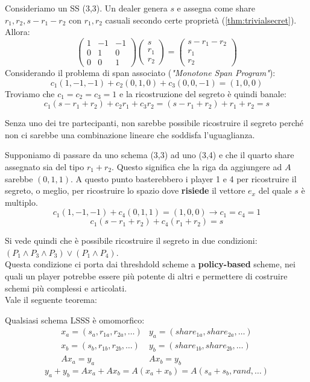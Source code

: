 \begin{example}
Consideriamo un SS (3,3). Un dealer genera $s$ e assegna come share $r_1,r_2,s-r_1-r_2$ con $r_1,r_2$ casuali secondo certe proprietà (\cref{thm:trivialsecret}). Allora:
\[
\left(\begin{array}{ccc}
  1 & - 1 & - 1\\
  0 & 1 & 0\\
  0 & 0 & 1
\end{array}\right)\left(\begin{array}{c}
  s\\
  r_1\\
  r_2
\end{array}\right)=\left(\begin{array}{c}
  s - r_1 - r_2\\
  r_1\\
  r_2
\end{array}\right)
\]
Considerando il problema di span associato (\textit{"Monotone Span Program"}): 
\[c_1(1,-1,-1)+c_2(0,1,0)+c_3(0,0,-1)=(1,0,0)\]
Troviamo che $c_1=c_2=c_3=1$ e la ricostruzione del segreto è quindi banale:
\[c_1(s-r_1+r_2)+c_2r_1+c_3r_2=(s-r_1+r_2)+r_1+r_2=s\]
\begin{note}
Senza uno dei tre partecipanti, non sarebbe possibile ricostruire il segreto perché non ci sarebbe una combinazione lineare che soddisfa l'uguaglianza.
\end{note}
\end{example}
\begin{note}
Supponiamo di passare da uno schema (3,3) ad uno (3,4) e che il quarto share assegnato sia del tipo $r_1+r_2$. Questo significa che la riga da aggiungere ad $A$ sarebbe $(0,1,1)$. A questo punto basterebbero i player 1 e 4 per ricostruire il segreto, o meglio, per ricostruire lo spazio dove \textbf{risiede} il vettore $e_x$ del quale $s$ è multiplo.
\[c_1(1,-1,-1)+c_4(0,1,1)=(1,0,0)\longrightarrow c_1=c_4=1\]
\[c_1(s-r_1+r_2)+c_4(r_1+r_2)=s\]
\end{note}
Si vede quindi che è possibile ricostruire il segreto in due condizioni: $(P_1\land P_3\land P_3)\lor(P_1\land P_4)$.\\
Questa condizione ci porta dai threshdold scheme a \textbf{policy-based} scheme, nei quali un player potrebbe essere più potente di altri e permettere di costruire schemi più complessi e articolati.\\
Vale il seguente teorema:
\begin{theorem}
Qualsiasi schema LSSS è omomorfico:
\[
\begin{array}{cc}
     x_a = (s_a,r_{1a},r_{2a},\dots)&  y_a=(share_{1a},share_{2a},\dots)\\
     x_b = (s_b,r_{1b},r_{2b},\dots)& y_b=(share_{1b},share_{2b},\dots)\\
     Ax_a=y_a & Ax_b=y_b
\end{array}
\]
\[y_a+y_b=Ax_a+Ax_b=A(x_a+x_b)=A(s_a+s_b,rand,\dots)\]
\end{theorem}

